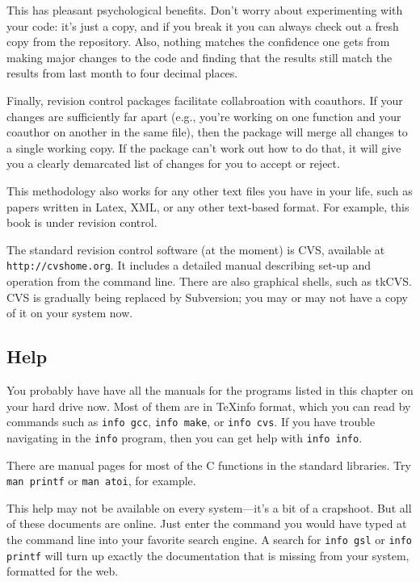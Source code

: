 \documentclass[12pt]{article}
\begin{document}
This has pleasant psychological benefits. Don't worry about experimenting
with your code: it's just a copy, and if you break it you can always check
out a fresh copy from the repository. Also, nothing matches the confidence
one gets from making major changes to the code and finding that the
results still match the results from last month to four decimal places.


Finally, revision control packages facilitate collabroation with
coauthors. If your changes are sufficiently far apart (e.g., you're
working on one function and your coauthor on another in the same file),
then the package will merge all changes to a single working copy. If
the package can't work out how to do that, it will give you a clearly
demarcated list of changes for you to accept or reject.

This methodology also works for any other text files you have in your
life, such as papers written in Latex, XML, or any other text-based
format. For example, this book is under revision control.

The standard revision control software (at the moment) is CVS, available at {\tt
http://cvshome.org}. It includes a detailed manual describing set-up and
operation from the command line. There are also graphical shells, such as tkCVS.
CVS is gradually being replaced by Subversion; you may or may not have a copy of
it on your system now.

\subsection{Help} 
You probably have have all the manuals for the programs listed in this
chapter on your hard drive now. Most of them are in \TeX info format,
which you can read by commands such as {\tt info gcc}, {\tt info make},
or {\tt info cvs}. If you have trouble navigating in the {\tt info}
program, then you can get help with {\tt info info}.

There are manual pages for most of the C functions in the standard libraries. Try
{\tt man printf} or {\tt man atoi}, for example.

This help may not be available on every system---it's a bit of
a crapshoot. But all of these documents are online. Just enter the
command you would have typed at the command line into your favorite
search engine. A search for {\tt info gsl} or {\tt info printf} will
turn up exactly the documentation that is missing from your system,
formatted for the web.
\end{document}
